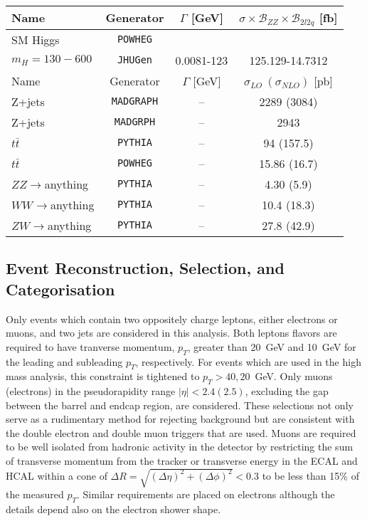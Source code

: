 \begin{table}
\begin{center}
\begin{tabular}{l|c|c|c}
\hline 
\hline
Name & Generator & $\Gamma$ [GeV] & $\sigma\times\mathscr{B}_{ZZ}\times\mathscr{B}_{2l2q}$ [fb] \\
\hline
SM Higgs  & \verb+POWHEG+ & & \\
$m_H=130-600$ & \verb+JHUGen+ & 0.0081-123 & 125.129-14.7312 \\ 
\hline \hline
Name & Generator & $\Gamma$ [GeV] & $\sigma_{LO}~(\sigma_{NLO})$ [pb] \\ \hline \hline
Z+jets    & \verb+MADGRAPH+ & -- & 2289 (3084) \\
Z+jets    & \verb+MADGRPH+  & -- & 2943        \\
$t\bar{t}$& \verb+PYTHIA+   & -- & 94 (157.5)  \\
$t\bar{t}$& \verb+POWHEG+   & -- & 15.86 (16.7)\\
$ZZ\to$anything & \verb+PYTHIA+ & -- & 4.30 (5.9) \\ 
$WW\to$anything & \verb+PYTHIA+ & -- & 10.4 (18.3) \\ 
$ZW\to$anything & \verb+PYTHIA+ & -- & 27.8 (42.9) \\ 
\hline\hline
\end{tabular}
\caption{}
\label{table:HZZ2l2qMCsamples}
\end{center}
\end{table}

\subsection{Event Reconstruction, Selection, and Categorisation}
\label{sec:HZZ2l2qselection}

Only events which contain two oppositely charge leptons, either electrons or
muons, and two jets are considered in this analysis.  Both leptons
flavors are required to have tranverse momentum, $p_T$, greater than 20~GeV
and 10~GeV for the leading and subleading $p_T$, respectively.  For events 
which are used in the high mass analysis, this constraint is tightened to 
$p_T>40, 20$~GeV.  Only muons (electrons) in the pseudorapidity range 
$|\eta|<2.4 (2.5)$, excluding the gap between the barrel and endcap region, 
are considered.  These selections not only serve as a rudimentary method for
rejecting background but are consistent with the double electron and 
double muon triggers that are used.  Muons are required to be well 
isolated from hadronic activity in the detector by restricting the sum of
transverse momentum from the tracker or transverse energy in the ECAL and
HCAL within a cone of $\Delta R  = \sqrt{(\Delta\eta)^2+(\Delta\phi)^2}<0.3$
to be less than 15\% of the measured $p_T$.  Similar requirements are placed
on electrons although the details depend also on the electron shower shape.

